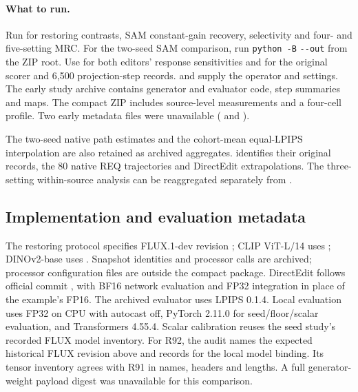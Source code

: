 \documentclass[10pt,doubleanonymous]{ieeeconf}
\begin{document}
\paragraph{What to run.}
Run  for restoring contrasts, SAM constant-gain recovery, selectivity and four- and five-setting MRC. For the two-seed SAM comparison, run \texttt{python -B}   \texttt{-{}-out}  from the ZIP root. Use  for both editors' response sensitivities and  for the original scorer and 6,500 projection-step records.  and  supply the operator and settings. The early study archive contains generator and evaluator code, step summaries and maps. The compact ZIP includes source-level measurements and a four-cell profile. Two early metadata files were unavailable ( and ).

The two-seed native path estimates and the cohort-mean equal-LPIPS interpolation are also retained as archived aggregates.  identifies their original records, the 80 native REQ trajectories and DirectEdit extrapolations. The three-setting within-source analysis can be reaggregated separately from .

\subsection{Implementation and evaluation metadata}
The restoring protocol specifies FLUX.1-dev revision ; CLIP ViT-L/14 uses ; DINOv2-base uses . Snapshot identities and processor calls are archived; processor configuration files are outside the compact package. DirectEdit follows official commit , with BF16 network evaluation and FP32 integration in place of the example's FP16. The archived evaluator uses LPIPS 0.1.4. Local evaluation uses FP32 on CPU with autocast off, PyTorch 2.11.0 for seed/floor/scalar evaluation, and Transformers 4.55.4. Scalar calibration reuses the seed study's recorded FLUX model inventory.
For R92, the audit names the expected historical FLUX revision above and records  for the local model binding. Its tensor inventory agrees with R91 in names, headers and lengths. A full generator-weight payload digest was unavailable for this comparison.
\end{document}
